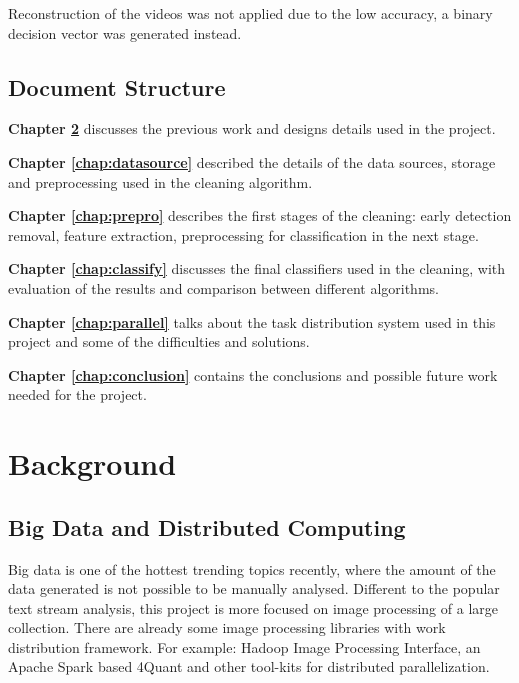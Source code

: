\documentclass[bsc,frontabs,twoside,fullspacing,parskip,deptreport]{infthesis}
\begin{document}
Reconstruction of the videos was not applied due to the low accuracy, a binary decision vector was generated instead.

\section{Document Structure}

\textbf{Chapter \ref{chap:bg}} discusses the previous work and designs details used in the project. 

\textbf{Chapter \ref{chap:datasource}} described the details of the data sources, storage and preprocessing used in the cleaning algorithm.

\textbf{Chapter \ref{chap:prepro}} describes the first stages of the cleaning: early detection removal, feature extraction, preprocessing for classification in the next stage.

\textbf{Chapter \ref{chap:classify}} discusses the final classifiers used in the cleaning, with evaluation of the results and comparison between different algorithms. 


\textbf{Chapter \ref{chap:parallel}} talks about the task distribution system used in this project and some of the difficulties and solutions.

\textbf{Chapter \ref{chap:conclusion}} contains the conclusions and possible future work needed for the project.
\newpage


\chapter{Background}
\label{chap:bg}

\section{Big Data and Distributed Computing}

Big data is one of the hottest trending topics recently, where the amount of the data generated is not possible to be manually analysed. 
Different to the popular text stream analysis, this project is more focused on image processing of a large collection. 
There are already some image processing libraries with work distribution framework. For example: Hadoop Image Processing Interface\cite{L3}, an Apache Spark based 4Quant\cite{L4} and other tool-kits for distributed parallelization.
\end{document}
